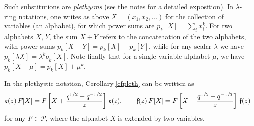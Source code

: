 Such substitutions are {\em plethysms} (see the notes \cite{Haiman} for a detailed exposition). In $\lambda$-ring notations, one writes as above
$X=(x_1,x_2,...)$ for the collection of variables (an alphabet), for which power sums are $p_k[X]=\sum_i x_i^k$.
For two alphabets $X$, $Y$, the sum $X+Y$ refers to the concatenation of the two alphabets, with power
sums $p_k[X+Y]=p_k[X]+p_k[Y]$, while for any scalar $\lambda$ we have $p_k[\lambda X]=\lambda^k p_k[X]$. 
Note finally that for a single variable alphabet $\mu$, we have $p_k[X+\mu]=p_k[X]+\mu^k$.

In the plethystic notation, Corollary \ref{efpleth} can be written as
\begin{equation}\label{plet} {\mathfrak e}(z) \,F[X]= F\left[X+\frac{q^{1/2}-q^{-1/2}}{z}\right]\,\mathfrak{e}(z),\qquad 
 {\mathfrak f}(z)\,F[X]=F\left[X-\frac{q^{1/2}-q^{-1/2}}{z}\right]\,\mathfrak{f}(z)  \end{equation}
for any $F\in {\mathcal P}$, 
where the alphabet $X$ is extended by two variables.
 
